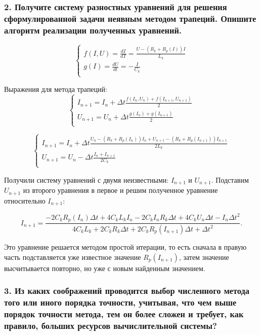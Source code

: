 \subsubsection{2. Получите систему разностных уравнений для решения сформулированной задачи неявным методом трапеций. Опишите алгоритм реализации полученных уравнений.}
$$
\left\{\begin{matrix}
	f(I, U) = \frac{dI}{dT} = \frac{U - (R_k + R_p(I))I}{L_k} \\ 
	g(I) = \frac{dU}{dt} = -\frac{I}{C_k}\\
\end{matrix}\right.
$$

Выражения для метода трапеций:
$$
\left\{\begin{matrix}
	I_{n+1} = I_n + \Delta t\frac{f(I_n, U_n) + f(I_{n+1}, U_{n+1})}{2}\\ 
	U_{n+1} = U_n + \Delta t\frac{g(I_n) + g(I_{n+1})}{2}\\
\end{matrix}\right.
$$

$$
\left\{\begin{matrix}
	I_{n+1} = I_n + \Delta t\frac{U_n - (R_k + R_p(I_n))I_n + U_{n+1} - (R_k + R_p(I_{n+1}))I_{n+1}}{2L_k}\\ 
	U_{n+1} = U_n - \Delta t\frac{I_n + I_{n+1}}{2C_k}\\
\end{matrix}\right.
$$

Получили систему уравнений с двумя неизвестными: $I_{n+1}$ и $U_{n+1}$. Подставим $U_{n+1}$ из второго уравнения в первое и решим полученное уравнение относительно $I_{n+1}$:

$$
I_{n+1} = \frac{-2C_k R_p(I_n)\Delta t + 4C_k L_k I_n - 2C_k I_n R_k \Delta t + 4C_k U_n \Delta t - I_n \Delta t^2 }{4C_k L_k + 2C_k R_k \Delta t + 2C_k R_p(I_{n+1}) \Delta t + \Delta t^2}.
$$

Это уравнение решается методом простой итерации, то есть сначала в правую часть подставляется уже известное значение $R_p(I_{n+1})$, затем значение высчитывается повторно, но уже с новым найденным значением.


\subsubsection{3. Из каких соображений проводится выбор численного метода того или иного порядка точности, учитывая, что чем выше порядок точности метода, тем он более сложен и требует, как правило, больших ресурсов вычислительной системы?}

